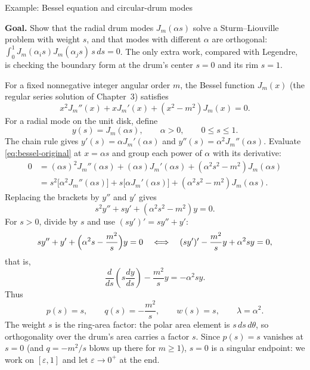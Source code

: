 \documentclass[11pt]{beamer}
\begin{document}
\begin{frame}[allowframebreaks=1.00]{Example: Bessel equation and circular-drum modes}
\footnotesize

\textbf{Goal.} Show that the radial drum modes $J_m(\alpha s)$ solve a Sturm--Liouville problem
with weight $s$, and that modes with different $\alpha$ are orthogonal:
$\int_0^1J_m(\alpha_is)J_m(\alpha_js)\,s\,ds=0$. The only extra work, compared with Legendre, is
checking the boundary form at the drum's center $s=0$ and its rim $s=1$.

For a fixed nonnegative integer angular order $m$, the Bessel function $J_m(x)$ (the regular series solution of Chapter~3) satisfies
\begin{equation}
  x^2J_m''(x)+xJ_m'(x)+(x^2-m^2)J_m(x)=0.
  \label{eq:bessel-original}
\end{equation}
For a radial mode on the unit disk, define
\[
  y(s)=J_m(\alpha s),
  \qquad \alpha>0,
  \qquad 0\leq s\leq1.
\]
The chain rule gives $y'(s)=\alpha J_m'(\alpha s)$ and $y''(s)=\alpha^2J_m''(\alpha s)$.
Evaluate \eqref{eq:bessel-original} at $x=\alpha s$ and group each power of
$\alpha$ with its derivative:
\begin{align*}
 0&=(\alpha s)^2J_m''(\alpha s)+(\alpha s)J_m'(\alpha s)+(\alpha^2s^2-m^2)J_m(\alpha s)\\
  &=s^2\bigl[\alpha^2J_m''(\alpha s)\bigr]+s\bigl[\alpha J_m'(\alpha s)\bigr]
    +(\alpha^2s^2-m^2)J_m(\alpha s).
\end{align*}
Replacing the brackets by $y''$ and $y'$ gives
\begin{equation}
 s^2y''+sy'+(\alpha^2s^2-m^2)y=0.\label{eq:bessel-s}
\end{equation}
For $s>0$, divide by $s$ and use $(sy')'=sy''+y'$:
\[
  sy''+y'+\Bigl(\alpha^2s-\frac{m^2}{s}\Bigr)y=0
  \quad\Longleftrightarrow\quad
  (sy')'-\frac{m^2}{s}y+\alpha^2sy=0,
\]
that is,
\begin{equation}
  \frac{d}{ds}\left(s\frac{dy}{ds}\right)-\frac{m^2}{s}y
  =-\alpha^2sy.
  \label{eq:bessel-SL}
\end{equation}
Thus
\[
  p(s)=s,
  \qquad q(s)=-\frac{m^2}{s},
  \qquad w(s)=s,
  \qquad \lambda=\alpha^2.
\]
The weight $s$ is the ring-area factor: the polar area element is $s\,ds\,d\theta$,
so orthogonality over the drum's area carries a factor $s$.
Since $p(s)=s$ vanishes at $s=0$ (and $q=-m^2/s$ blows up there for $m\ge1$), $s=0$ is a
singular endpoint: we work on $[\varepsilon,1]$ and let $\varepsilon\to0^+$ at the end.


\end{frame}
\end{document}
